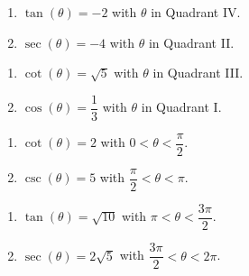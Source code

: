 \begin{multicols}{2}

\begin{enumerate}

\setcounter{enumi}{\value{HW}}

\item  $\tan(\theta) = -2$ with $\theta$ in Quadrant IV.
\item  $\sec(\theta) = -4$ with $\theta$ in Quadrant II.

\setcounter{HW}{\value{enumi}}

\end{enumerate}

\end{multicols}

\begin{multicols}{2}

\begin{enumerate}

\setcounter{enumi}{\value{HW}}

\item $\cot(\theta) = \sqrt{5}$ with $\theta$ in Quadrant III. 
\item  $\cos(\theta) = \dfrac{1}{3}$ with $\theta$ in Quadrant I.

\setcounter{HW}{\value{enumi}}

\end{enumerate}

\end{multicols}

\begin{multicols}{2}

\begin{enumerate}

\setcounter{enumi}{\value{HW}}

\item  $\cot(\theta) = 2$ with $0  < \theta < \dfrac{\pi}{2}$.
\item  $\csc(\theta) = 5$ with $\dfrac{\pi}{2} < \theta < \pi$.

\setcounter{HW}{\value{enumi}}

\end{enumerate}

\end{multicols}

\begin{multicols}{2}

\begin{enumerate}

\setcounter{enumi}{\value{HW}}

\item  $\tan(\theta) = \sqrt{10}$ with $\pi < \theta < \dfrac{3\pi}{2}$.
\item  $\sec(\theta) = 2\sqrt{5}$ with $\dfrac{3\pi}{2} < \theta < 2\pi$. \label{findothercirclast}

\setcounter{HW}{\value{enumi}}

\end{enumerate}

\end{multicols}

